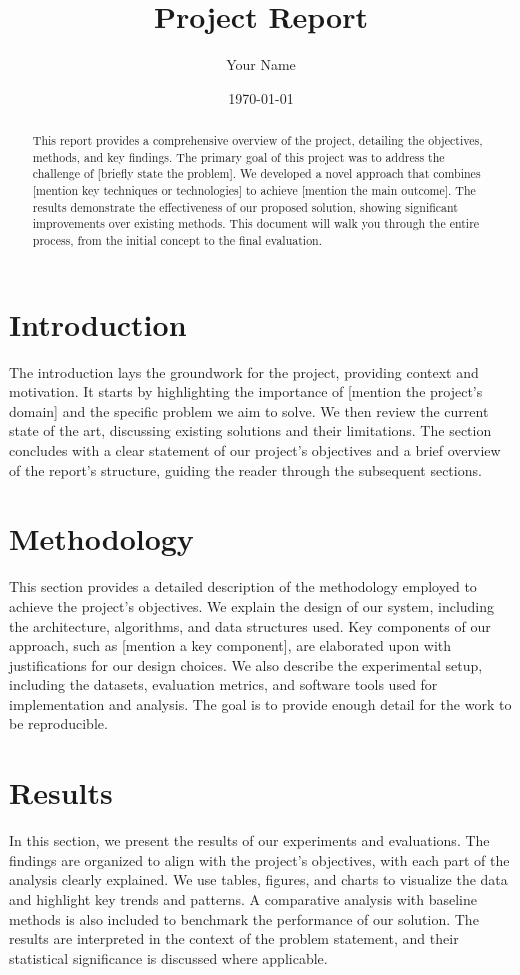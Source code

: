\documentclass{article}
\title{Project Report}
\author{Your Name}
\date{\today}
\begin{document}
\maketitle

\begin{abstract}
    This report provides a comprehensive overview of the project, detailing the objectives, methods, and key findings. The primary goal of this project was to address the challenge of [briefly state the problem]. We developed a novel approach that combines [mention key techniques or technologies] to achieve [mention the main outcome]. The results demonstrate the effectiveness of our proposed solution, showing significant improvements over existing methods. This document will walk you through the entire process, from the initial concept to the final evaluation.
\end{abstract}

\section{Introduction}
    The introduction lays the groundwork for the project, providing context and motivation. It starts by highlighting the importance of [mention the project's domain] and the specific problem we aim to solve. We then review the current state of the art, discussing existing solutions and their limitations. The section concludes with a clear statement of our project's objectives and a brief overview of the report's structure, guiding the reader through the subsequent sections.

\section{Methodology}
    This section provides a detailed description of the methodology employed to achieve the project's objectives. We explain the design of our system, including the architecture, algorithms, and data structures used. Key components of our approach, such as [mention a key component], are elaborated upon with justifications for our design choices. We also describe the experimental setup, including the datasets, evaluation metrics, and software tools used for implementation and analysis. The goal is to provide enough detail for the work to be reproducible.

\section{Results}
    In this section, we present the results of our experiments and evaluations. The findings are organized to align with the project's objectives, with each part of the analysis clearly explained. We use tables, figures, and charts to visualize the data and highlight key trends and patterns. A comparative analysis with baseline methods is also included to benchmark the performance of our solution. The results are interpreted in the context of the problem statement, and their statistical significance is discussed where applicable.
\end{document}
